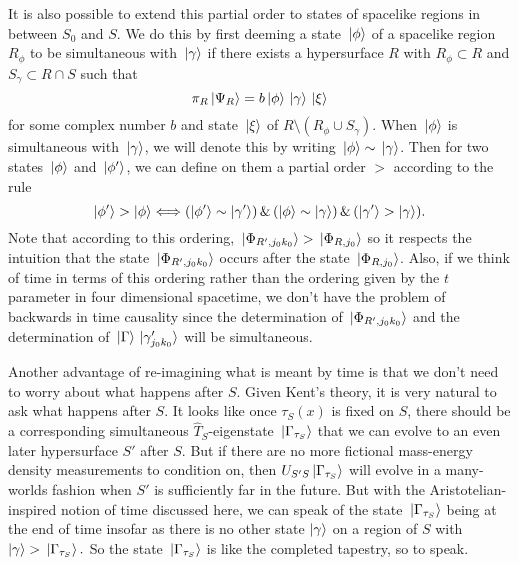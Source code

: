 It is also possible to extend this partial order to states of spacelike regions in between $S_0$ and $S$. We do this by first deeming a state $\ket*{\phi}$ of a spacelike region $R_\phi$ to be simultaneous with $\ket*{\gamma}$ if there exists a hypersurface $R$ with $R_\phi\subset R$ and $S_\gamma \subset R\cap S$ such that 
$$\pi_R\ket*{\Psi_R}=b\ket*{\phi}\ket*{\gamma}\ket*{\xi}$$ 
for some complex number $b$ and state $\ket*{\xi}$ of $R\setminus(R_\phi\cup S_\gamma)$. When $\ket*{\phi}$  is simultaneous with  $\ket*{\gamma}$, we will denote this by writing 
$\ket*{\phi}\sim \ket*{\gamma}$. %
%
Then for two states $\ket*{\phi}$ and $\ket*{\phi'}$, we can define on them a partial order $>$ according to the rule
\begin{equation}
\ket{\phi'}>\ket{\phi}\Longleftrightarrow 
(\ket{\phi'}\sim\ket{\gamma'}) \,\&\, (\ket{\phi}\sim\ket{\gamma})\, \&\, (\ket{\gamma'}>\ket{\gamma}).
\end{equation}
Note that according to this ordering, $\ket*{\Phi_{R', j_0k_0}}>\ket*{\Phi_{R,j_0}}$ so it respects the intuition that the state $\ket*{\Phi_{R', j_0k_0}}$ occurs after the state $\ket*{\Phi_{R,j_0}}$. Also, if we think of time in terms of this ordering rather than the ordering given by the $t$ parameter in four dimensional spacetime, we don't have the problem of backwards in time causality since the determination of $\ket*{\Phi_{R', j_0k_0}}$ and the determination of $\ket*{\Gamma}\ket*{\gamma_{j_0k_0}'}$ will be simultaneous. 

Another advantage of re-imagining what is meant by time is that we don't need to worry about what happens after $S$. Given Kent's theory, it is very natural to ask what happens after $S$. It looks like once $\tau_S(x)$ is fixed on $S$, there should be a corresponding simultaneous $\hat{T}_S$-eigenstate $\ket*{\Gamma_{\tau_S}}$ %
%
that we can evolve to an even later hypersurface $S'$ after $S$. But if there are no more fictional mass-energy density measurements to condition on, then $U_{S'S}\ket*{\Gamma_{\tau_S}}$ will evolve in a many-worlds fashion when $S'$ is sufficiently far in the future. But with the Aristotelian-inspired notion of time discussed here, we can speak of the state $\ket*{\Gamma_{\tau_S}}$ being at the end of time insofar as there is no other state $\ket{\gamma}$  on a region of $S$ with $\ket{\gamma}>\ket*{\Gamma_{\tau_S}}.$ So the state $\ket*{\Gamma_{\tau_S}}$ is like the completed tapestry, so to speak. 

